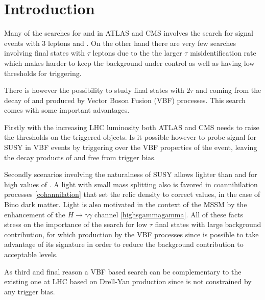 \section {Introduction}

Many of the searches for \charginopm and \neutralinotwo in ATLAS and CMS involves the search for signal events with 3 leptons and \met. On the other hand there are very few searches involving final states with $\tau$ leptons due to the the larger $\tau$ misidentification rate which makes harder to keep the background under control as well as having low \pt thresholds for triggering.

There is however the possibility to study final states with $2\tau$ and \met coming from the decay of \charginopm and \neutralinotwo produced by Vector Boson Fusion (VBF) processes. This search comes with some important advantages.

Firstly with the increasing LHC luminosity both ATLAS and CMS needs to raise the \pt thresholds on the triggered objects. Is it possible however to probe signal for SUSY in VBF events by triggering over the VBF properties of the event, leaving the decay products of \charginopm and \neutralinotwo free from trigger bias. 

Secondly scenarios involving the naturalness of SUSY allows \stau lighter than \smuon and \selectron for high values of \tanbeta. A light \stau with small mass splitting also is favored in coannihilation processes \ref{cohannilation} that set the relic density to correct values, in the case of Bino dark matter. Light \stau is also motivated in the context of the MSSM by the enhancement of the $H \longrightarrow \gamma\gamma$ channel \ref{highsgammagamma}. All of these facts stress on the importance of the search for low \pt $\tau$ final states with large background contribution, for which production by the VBF processes since is possible to take advantage of its signature in order to reduce the background contribution to acceptable levels. 

As third and final reason a VBF based search can be complementary to the existing one at LHC based on Drell-Yan production since is not constrained by any trigger bias. 


